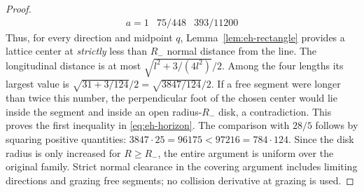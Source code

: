 \begin{proof}
\[\begin{array}{c|c|c}
a=1&75/448&393/11200
\end{array}
\]
Thus, for every direction and midpoint $q$, Lemma~\ref{lem:eh-rectangle}
provides a lattice center at \emph{strictly} less than $R_-$ normal
distance from the line. The longitudinal distance is at most
$\sqrt{l^2+3/(4l^2)}/2$. Among the four lengths its largest value is
$\sqrt{31+3/124}/2=\sqrt{3847/124}/2$.
If a free segment were longer than twice this number, the perpendicular
foot of the chosen center would lie inside the segment and inside an
open radius-$R_-$ disk, a contradiction. This proves the first
inequality in \eqref{eq:eh-horizon}. The comparison with $28/5$ follows
by squaring positive quantities:
$3847\cdot25=96175<97216=784\cdot124$.
Since the disk radius is only increased for $R\ge R_-$, the entire
argument is uniform over the original family. Strict normal clearance
in the covering argument includes limiting directions and grazing free
segments; no collision derivative at grazing is used.
\end{proof}

